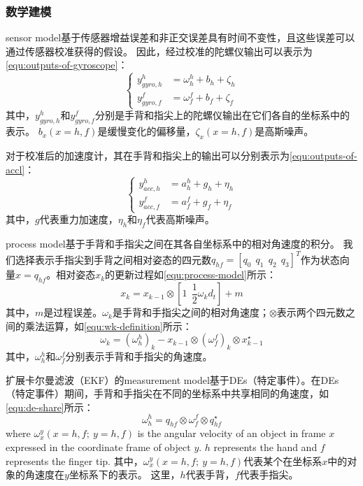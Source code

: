 \subsubsection{数学建模}
sensor model基于传感器增益误差和非正交误差具有时间不变性，且这些误差可以通过传感器校准获得的假设。
因此，经过校准的陀螺仪输出可以表示为\autoref{equ:outputs-of-gyroscope}：
\begin{equation}
    \label{equ:outputs-of-gyroscope}
    \begin{cases}
        y_{gyro,h}^h &= \omega_h^h + b_h + \zeta_h \\
        y_{gyro,f}^f &= \omega_f^f + b_f + \zeta_f
    \end{cases}
\end{equation}
其中，$y_{gyro,h}^h$和$y_{gyro,f}^f$分别是手背和指尖上的陀螺仪输出在它们各自的坐标系中的表示。
$b_x(x=h,f)$是缓慢变化的偏移量，$\zeta_x(x=h,f)$是高斯噪声。

对于校准后的加速度计，其在手背和指尖上的输出可以分别表示为\autoref{equ:outputs-of-accl}：
\begin{equation}
    \label{equ:outputs-of-accl}
    \begin{cases}
        y_{acc,h}^h &= a_h^h + g_h + \eta_h \\
        y_{acc,f}^f &= a_f^f + g_f + \eta_f
    \end{cases}
\end{equation}
其中，$g$代表重力加速度，$\eta_h$和$\eta_f$代表高斯噪声。

process model基于手背和手指尖之间在其各自坐标系中的相对角速度的积分。
我们选择表示手指尖到手背之间相对姿态的四元数$q_{hf} = [q_0\ \ q_1\ \ q_2\ \ q_3]^T$作为状态向量$x = q_{hf}$。相对姿态$x_k$的更新过程如\autoref{equ:process-model}所示：
\begin{equation}
    \label{equ:process-model}
    x_k = x_{k-1} \otimes [1\ \ \frac{1}{2}\omega_k d_t] + m
\end{equation}
其中，$m$是过程误差。$\omega_k$是手背和手指尖之间的相对角速度；$\otimes$表示两个四元数之间的乘法运算，如\autoref{equ:wk-definition}所示：
\begin{equation}
    \label{equ:wk-definition}
    \omega_k = (\omega_h^h)_k - x_{k-1} \otimes (\omega_f^f)_k \otimes x_{k-1}^{\star}
\end{equation}
其中，$\omega_h^h$和$\omega_f^f$分别表示手背和手指尖的角速度。

扩展卡尔曼滤波（EKF）的measurement model基于DEs（特定事件）。在DEs（特定事件）期间，手背和手指尖在不同的坐标系中共享相同的角速度，如\autoref{equ:de-share}所示：
\begin{equation}
    \label{equ:de-share}
    \omega_h^h = q_{hf} \otimes \omega_f^f \otimes q_{hf}^{\star}
\end{equation}
where $\omega_x^y(x=h,f;\ y=h,f)$ is the angular velocity of an object in frame $x$ expressed in the coordinate frame of object $y$. 
$h$ represents the hand and $f$ represents the finger tip.
其中，$\omega_x^y(x=h,f;\ y=h,f)$代表某个在坐标系$x$中的对象的角速度在$y$坐标系下的表示。
这里，$h$代表手背，$f$代表手指尖。

